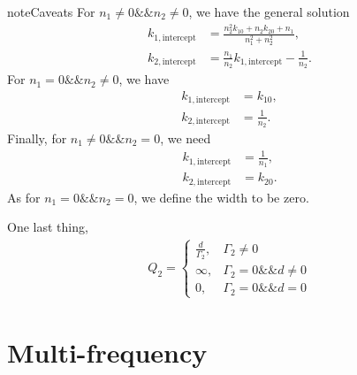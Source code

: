 \documentclass[letterpaper,12pt,english]{sphinxmanual}
\begin{document}
\begin{sphinxadmonition}{note}{Caveats}
For \(n_1\neq 0\&\& n_2\neq 0\), we have the general solution
\begin{equation*}
\begin{split}k_{1,\mathrm{intercept}} &= \frac{n_2^2 k_{10} + n_2 k_{20} + n_1 }{n_1^2 + n_2^2}, \\
k_{2,\mathrm{intercept}} &= \frac{n_1}{n_2}k_{1,\mathrm{intercept}} - \frac{1}{n_2}.\end{split}
\end{equation*}
For \(n_1=0\&\& n_2\neq 0\), we have
\begin{equation*}
\begin{split}k_{1,\mathrm{intercept}} &= k_{10}, \\
k_{2,\mathrm{intercept}} &= \frac{1}{n_2}.\end{split}
\end{equation*}
Finally, for \(n_1\neq 0\&\& n_2 =0\), we need
\begin{equation*}
\begin{split}k_{1,\mathrm{intercept}} &=\frac{1}{n_1}, \\
k_{2,\mathrm{intercept}} &= k_{20}.\end{split}
\end{equation*}
As for \(n_1=0\&\& n_2=0\), we define the width to be zero.

One last thing,
\begin{equation*}
\begin{split}Q_2 = \begin{cases}
\frac{d}{\Gamma_2}, & \Gamma_2\neq 0 \\
\infty, & \Gamma_2 = 0\&\& d\neq 0\\
0, & \Gamma_2=0\&\& d = 0
\end{cases}\end{split}
\end{equation*}\end{sphinxadmonition}


\section{Multi-frequency}
\label{\detokenize{matter-stimulated/multi-frequency::doc}}\label{\detokenize{matter-stimulated/multi-frequency:multi-frequency}}
\end{document}
